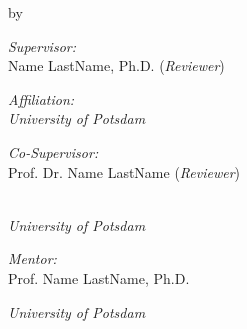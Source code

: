 \documentclass[
11pt, %
english, %
singlespacing, %
headsepline, %
onecolumn
]{MastersDoctoralThesis} %
\begin{document}
\begin{committee}
\begin{center}

{\Large \bfseries \ttitle\par}\vspace{0.4cm} %


by \authorname\\

\vfill
 
\begin{minipage}[t]{0.43\textwidth}
\begin{flushleft} \large
\emph{Supervisor:}\\
\vspace{\baselineskip}
Name LastName, Ph.D. (\textit{Reviewer})\\
\end{flushleft}
\end{minipage}
\begin{minipage}[t]{0.56\textwidth}
\begin{flushright} \large
\emph{Affiliation:}\\
\vspace{\baselineskip}
\textit{University of Potsdam}\\ 
\end{flushright}
\end{minipage}

\bigskip

\begin{minipage}[t]{0.43\textwidth}
\begin{flushleft} \large
\emph{Co-Supervisor:}\\
\vspace{\baselineskip}
Prof. Dr. Name LastName (\textit{Reviewer})\\
\end{flushleft}
\end{minipage}
\begin{minipage}[t]{0.56\textwidth}
\begin{flushright} \large
\emph{} \\
\vspace{\baselineskip}
\textit{University of Potsdam}\\ 
\end{flushright}
\end{minipage}

\bigskip

\begin{minipage}[t]{0.43\textwidth}
\begin{flushleft} \large
\emph{Mentor:}\\
\vspace{\baselineskip}
Prof. Name LastName, Ph.D.
\end{flushleft}
\end{minipage}
\begin{minipage}[t]{0.56\textwidth}
\begin{flushright} \large
\vspace{\baselineskip}
\textit{University of Potsdam}
\end{flushright}
\end{minipage}


\end{center}
\end{committee}
\end{document}
